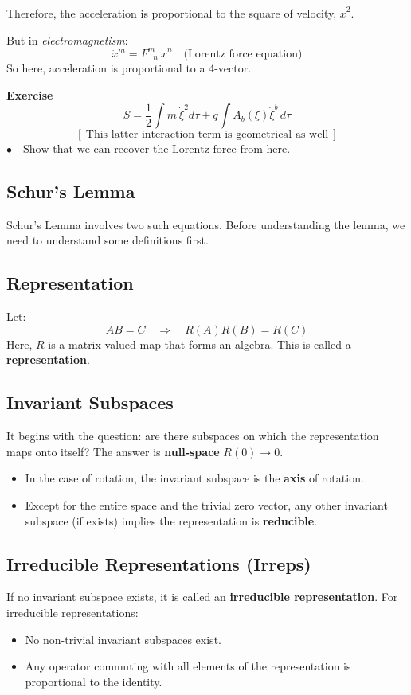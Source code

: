\documentclass[14pt]{article} %
\begin{document}
\noindent
Therefore, the acceleration is proportional to the square of velocity, $\dot{x}^2$.

But in \textit{electromagnetism}:
\[
\ddot{x}^m = F^m_{~~~n}~\dot{x}^n \quad \text{(Lorentz force equation)}
\]
So here, acceleration is proportional to a 4-vector.
\begin{framed}
\noindent
\textbf{Exercise}
\[
S = \frac{1}{2} \int m~ \dot{\xi}^2 d\tau + q \int A_b(\xi) \dot{\xi}^b \, d\tau
\]
\[
\left[~\text{This latter interaction term is geometrical as well}~\right]
\]
$\bullet \quad\text{Show that we can recover the Lorentz force from here.}$
\end{framed}
\subsection{Schur's Lemma}
Schur's Lemma involves two such equations. Before understanding the lemma, we need to understand some definitions first.

\subsection*{Representation}
Let:
\[
AB = C \quad\Rightarrow \quad R(A)R(B) = R(C)
\]
Here, $R$ is a matrix-valued map that forms an algebra. This is called a \textbf{representation}.

\subsection*{Invariant Subspaces}
It begins with the question: are there subspaces on which the representation maps onto itself? The answer is \textbf{null-space} $R(0) \rightarrow 0$.
\begin{itemize}
    \item In the case of rotation, the invariant subspace is the \textbf{axis} of rotation.
    \item Except for the entire space and the trivial zero vector, any other invariant subspace (if exists) implies the representation is \textbf{reducible}.
\end{itemize}
\subsection*{Irreducible Representations (Irreps)}
If no invariant subspace exists, it is called an \textbf{irreducible representation}. For irreducible representations:
\begin{itemize}
    \item No non-trivial invariant subspaces exist.
    \item Any operator commuting with all elements of the representation is proportional to the identity.
\end{itemize}
\end{document}
